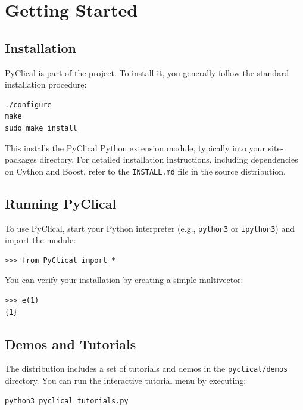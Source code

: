 \chapter{Getting Started}
\label{ch:getting_started_pyclical}

\section{Installation}
PyClical is part of the \glucat project. To install it, you generally follow the standard \glucat installation procedure:

\begin{verbatim}
./configure
make
sudo make install
\end{verbatim}

This installs the PyClical Python extension module, typically into your site-packages directory.
For detailed installation instructions, including dependencies on Cython and Boost, refer to the \texttt{INSTALL.md} file in the source distribution.

\section{Running PyClical}
To use PyClical, start your Python interpreter (e.g., \texttt{python3} or \texttt{ipython3}) and import the module:

\begin{verbatim}
>>> from PyClical import *
\end{verbatim}

You can verify your installation by creating a simple multivector:

\begin{verbatim}
>>> e(1)
{1}
\end{verbatim}

\section{Demos and Tutorials}
The distribution includes a set of tutorials and demos in the \texttt{pyclical/demos} directory.
You can run the interactive tutorial menu by executing:

\begin{verbatim}
python3 pyclical_tutorials.py
\end{verbatim}
